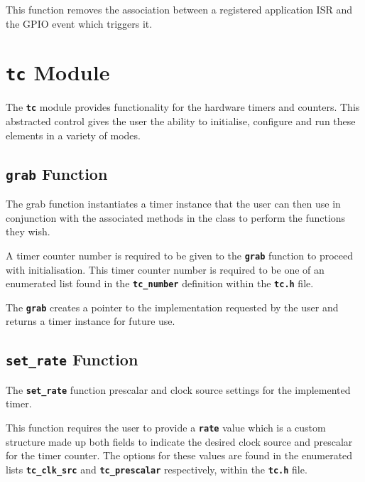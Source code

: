 \documentclass[a4paper, oneside, 11pt, titlepage, onecolumn, openright]{report}
\begin{document}
					This function removes the association between a registered application ISR and the GPIO event which triggers it. 
			
			\section{\textbf{\texttt{tc}} Module}
				\label{s:Hardware Abstraction Libraries:tc Module}
				
				The \textbf{\texttt{tc}} module provides functionality for the hardware timers and counters. This abstracted control gives the user the ability to initialise, configure and run these elements in a variety of modes.
			
				\subsection{\textbf{\texttt{grab}} Function}
					\label{ss:Hardware Abstraction Libraries:tc Module:grab Function}
					
					The grab function instantiates a timer instance that the user can then use in conjunction with the associated methods in the class to perform the functions they wish.
			
A timer counter number is required to be given to the \textbf{\texttt{grab}} function to proceed with initialisation. This timer counter number is required to be one of an enumerated list found in the \textbf{\texttt{tc\_number}} definition within the \textbf{\texttt{tc.h}} file. 
			
The \textbf{\texttt{grab}} creates a pointer to the implementation requested by the user and returns a timer instance for future use. 
			
				\subsection{\textbf{\texttt{set\_rate}} Function}
					\label{ss:Hardware Abstraction Libraries:tc Module:set_rate Function}
			
					The \textbf{\texttt{set\_rate}} function prescalar and clock source settings for the implemented timer.
			
This function requires the user to provide a \textbf{\texttt{rate}} value which is a custom structure made up both fields to indicate the desired clock source and prescalar for the timer counter. The options for these values are found in the enumerated lists \textbf{\texttt{tc\_clk\_src}} and \textbf{\texttt{tc\_prescalar}} respectively, within the \textbf{\texttt{tc.h}} file.
			
\end{document}
